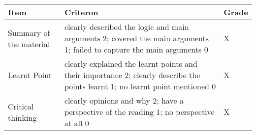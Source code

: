 \documentclass[11pt,]{article}
\theoremstyle{definition}
\theoremstyle{definition}
\theoremstyle{remark}
\begin{document}
\begin{longtable}[]{@{}lll@{}}
\toprule
\begin{minipage}[b]{0.15\columnwidth}\raggedright\strut
Item\strut
\end{minipage} & \begin{minipage}[b]{0.72\columnwidth}\raggedright\strut
Criteron\strut
\end{minipage} & \begin{minipage}[b]{0.05\columnwidth}\raggedright\strut
Grade\strut
\end{minipage}\tabularnewline
\midrule
\endhead
\begin{minipage}[t]{0.15\columnwidth}\raggedright\strut
Summary of the material\strut
\end{minipage} & \begin{minipage}[t]{0.72\columnwidth}\raggedright\strut
clearly described the logic and main arguments 2; covered the main
arguments 1; failed to capture the main arguments 0\strut
\end{minipage} & \begin{minipage}[t]{0.05\columnwidth}\raggedright\strut
X\strut
\end{minipage}\tabularnewline
\begin{minipage}[t]{0.15\columnwidth}\raggedright\strut
Learnt Point\strut
\end{minipage} & \begin{minipage}[t]{0.72\columnwidth}\raggedright\strut
clearly explained the learnt points and their importance 2; clearly
describe the points learnt 1; no learnt point mentioned 0\strut
\end{minipage} & \begin{minipage}[t]{0.05\columnwidth}\raggedright\strut
X\strut
\end{minipage}\tabularnewline
\begin{minipage}[t]{0.15\columnwidth}\raggedright\strut
Critical thinking\strut
\end{minipage} & \begin{minipage}[t]{0.72\columnwidth}\raggedright\strut
clearly opinions and why 2; have a perspective of the reading 1; no
perspective at all 0\strut
\end{minipage} & \begin{minipage}[t]{0.05\columnwidth}\raggedright\strut
X\strut
\end{minipage}\tabularnewline
\bottomrule
\end{longtable}

\clearpage
\end{document}
